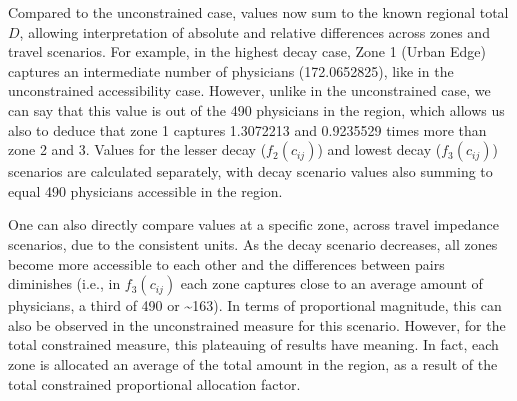 \documentclass[
  10pt,
  letterpaper,
]{article}
\begin{document}
\begin{table}

\caption{\label{tbl-simple-example-total-opportunity-accessibility}Simple
system: total constrained accessible opportunities.}


\end{table}%

Compared to the unconstrained case, values now sum to the known regional
total \(D\), allowing interpretation of absolute and relative
differences across zones and travel scenarios. For example, in the
highest decay case, Zone 1 (Urban Edge) captures an intermediate number
of physicians (172.0652825), like in the unconstrained accessibility
case. However, unlike in the unconstrained case, we can say that this
value is out of the 490 physicians in the region, which allows us also
to deduce that zone 1 captures 1.3072213 and 0.9235529 times more than
zone 2 and 3. Values for the lesser decay (\(f_2(c_{ij})\)) and lowest
decay (\(f_3(c_{ij})\)) scenarios are calculated separately, with decay
scenario values also summing to equal 490 physicians accessible in the
region.

One can also directly compare values at a specific zone, across travel
impedance scenarios, due to the consistent units. As the decay scenario
decreases, all zones become more accessible to each other and the
differences between pairs diminishes (i.e., in \(f_3(c_{ij})\) each zone
captures close to an average amount of physicians, a third of 490 or
\textasciitilde163). In terms of proportional magnitude, this can also
be observed in the unconstrained measure for this scenario. However, for
the total constrained measure, this plateauing of results have meaning.
In fact, each zone is allocated an average of the total amount in the
region, as a result of the total constrained proportional allocation
factor.
\end{document}

